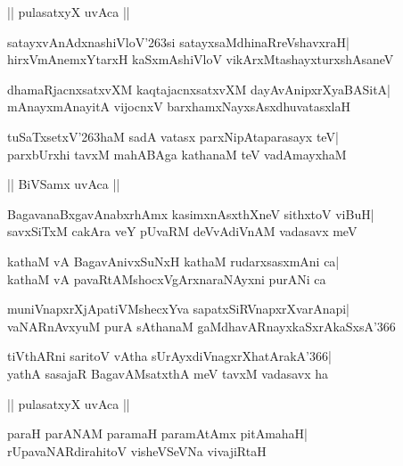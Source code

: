 \documentclass[twoside,12pt,openright]{book}
\def\S{\char'263}
\newcounter{shloka}[chapter]
\begin{document}
\begin{center}
|| pulasatxyX uvAca ||
\end{center}
\begin{shloka}%
satayxvAnAdxnashiVloV\S si satayxsaMdhinaRreVshavxraH|\\
hirxVmAnemxYtarxH kaSxmAshiVloV vikArxMtashayxturxshAsaneV
\end{shloka}

\begin{shloka}%
dhamaRjacnxsatxvXM kaqtajacnxsatxvXM dayAvAnipxrXyaBASitA|\\
mAnayxmAnayitA vijocnxV barxhamxNayxsAsxdhuvatasxlaH
\end{shloka}

\begin{shloka}%
tuSaTxsetxV\S haM sadA vatasx parxNipAtaparasayx teV|\\
parxbUrxhi tavxM mahABAga kathanaM teV vadAmayxhaM
\end{shloka}

\begin{center}
|| BiVSamx uvAca ||
\end{center}
\begin{shloka}%
BagavanaBxgavAnabxrhAmx kasimxnAsxthXneV sithxtoV viBuH|\\
savxSiTxM cakAra veY pUvaRM deVvAdiVnAM vadasavx meV
\end{shloka}

\begin{shloka}%
kathaM vA BagavAnivxSuNxH kathaM rudarxsasxmAni ca|\\
kathaM vA pavaRtAMshocxVgArxnaraNAyxni purANi ca
\end{shloka}

\begin{shloka}%
muniVnapxrXjApatiVMshecxYva sapatxSiRVnapxrXvarAnapi|\\
vaNARnAvxyuM purA sAthanaM gaMdhavARnayxkaSxrAkaSxsA\char'366
\end{shloka}

\begin{shloka}%
tiVthARni saritoV vAtha sUrAyxdiVnagxrXhatArakA\char'366|\\
yathA sasajaR BagavAMsatxthA meV tavxM vadasavx ha
\end{shloka}

\begin{center}
|| pulasatxyX uvAca ||
\end{center}
\begin{shloka}%
paraH parANAM paramaH paramAtAmx pitAmahaH|\\
rUpavaNARdirahitoV visheVSeVNa vivajiRtaH
\end{shloka}
\end{document}
